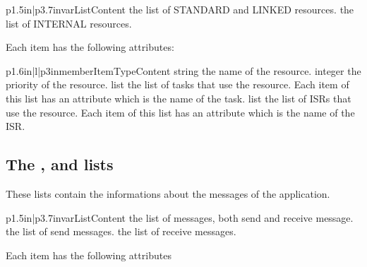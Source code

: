 \begin{longtableii}{p{1.5in}|p{3.7in}}{var}{List}{Content}
  {the list of STANDARD and LINKED resources.}
  {the list of INTERNAL resources.}
\end{longtableii}

Each item has the following attributes:

\begin{longtableiii}{p{1.6in}|l|p{3in}}{member}{Item}{Type}{Content}
  {string}
  {the name of the resource.}
  {integer}
  {the priority of the resource.}
  {list}
  {the list of tasks that use the resource. Each item of this list has an attribute  which is the name of the task.}
  {list}
  {the list of ISRs that use the resource. Each item of this list has an attribute  which is the name of the ISR.}
\end{longtableiii}

\subsection{The ,  and  lists}

These lists contain the informations about the messages of the application.

\begin{longtableii}{p{1.5in}|p{3.7in}}{var}{List}{Content}
  {the list of messages, both send and receive message.}
  {the list of send messages.}
  {the list of receive messages.}
\end{longtableii}

Each item has the following attributes

